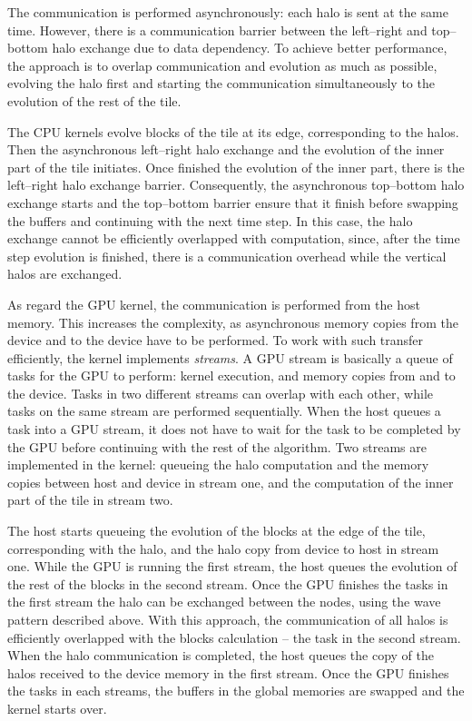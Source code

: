 The communication is performed asynchronously: each halo is sent at the same time. However, there is a communication barrier between the left--right and top--bottom halo exchange due to data dependency. To achieve better performance, the approach is to overlap communication and evolution as much as possible, evolving the halo first and starting the communication simultaneously to the evolution of the rest of the tile. 

The CPU kernels evolve blocks of the tile at its edge, corresponding to the halos. Then the asynchronous left--right halo exchange and the evolution of the inner part of the tile initiates. Once finished the evolution of the inner part, there is the left--right halo exchange barrier. Consequently, the asynchronous top--bottom halo exchange starts and the top--bottom barrier ensure that it finish before swapping the buffers and continuing with the next time step. In this case, the halo exchange cannot be efficiently overlapped with computation, since, after the time step evolution is finished, there is a communication overhead while the vertical halos are exchanged.

As regard the GPU kernel, the communication is performed from the host memory. This increases the complexity, as asynchronous memory copies from the device and to the device have to be performed. To work with such transfer efficiently, the kernel implements \textit{streams}. A GPU stream is basically a queue of tasks for the GPU to perform: kernel execution, and memory copies from and to the device. Tasks in two different streams can overlap with each other, while tasks on the same stream are performed sequentially. When the host queues a task into a GPU stream, it does not have to wait for the task to be completed by the GPU before continuing with the rest of the algorithm. Two streams are implemented in the kernel: queueing the halo computation and the memory copies between host and device in stream one, and the computation of the inner part of the tile in stream two.

The host starts queueing the evolution of the blocks at the edge of the tile, corresponding with the halo, and the halo copy from device to host in stream one. While the GPU is running the first stream, the host queues the evolution of the rest of the blocks in the second stream. Once the GPU finishes the tasks in the first stream the halo can be exchanged between the nodes, using the wave pattern described above. With this approach, the communication of all halos is efficiently overlapped with the blocks calculation -- the task in the second stream. When the halo communication is completed, the host queues the copy of the halos received to the device memory in the first stream. Once the GPU finishes the tasks in each streams, the buffers in the global memories are swapped and the kernel starts over.

